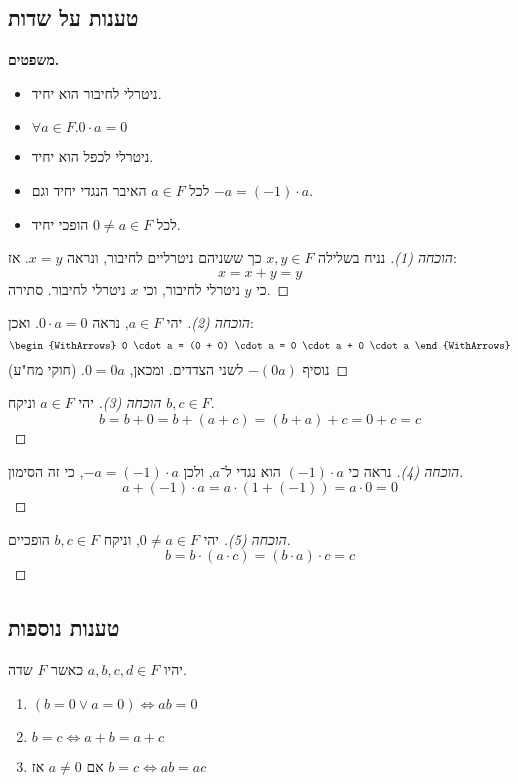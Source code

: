 \documentclass[]{article}
\begin{document}
	\subsection{טענות על שדות}
	\textbf{משפטים. }
	\begin{itemize}
		\item ניטרלי לחיבור הוא יחיד. 
		\item $\forall a \in F. 0 \cdot a = 0$ 
		\item ניטרלי לכפל הוא יחיד. 
		\item לכל $a \in F$ האיבר הנגדי יחיד וגם $-a = (-1) \cdot a$. 
		\item לכל $0 \neq a \in F$ הופכי יחיד. 
	\end{itemize}
	\begin{proof}[הוכחה (1)]נניח בשלילה $x, y \in F$ כך ששניהם ניטרליים לחיבור, ונראה $x = y$. אז: 
		\[ x = x + y = y \]
		כי $y$ ניטרלי לחיבור, וכי $x$ ניטרלי לחיבור. סתירה. 
	\end{proof}
	
	\begin{proof}[הוכחה (2)]
		יהי $a \in F$, נראה $0 \cdot a = 0$. ואכן: 
		\[ \begin{WithArrows}
			0 \cdot a = (0 + 0) \cdot a = 0 \cdot a + 0 \cdot a
		\end{WithArrows} \]
		נוסיף $-(0a)$ לשני הצדדים. ומכאן, $0 = 0a$. (חוקי מח"ע)
	\end{proof}
	
	\begin{proof}[הוכחה (3)]
		יהי $a \in F$ וניקח $b, c \in F$. 
		\[ b = b + 0 = b + (a + c) = (b + a) + c = 0 + c = c \]
	\end{proof}
	
	\begin{proof}[הוכחה (4)]
		נראה כי $(-1) \cdot a$ הוא נגדי ל־$a$, ולכן $-a = (-1) \cdot a$, כי זה הסימון. 
		\[ a + (-1) \cdot a = a \cdot (1 + (-1)) = a \cdot 0 = 0 \]
	\end{proof}
	
	\begin{proof}[הוכחה (5)]
		יהי $0 \neq a \in F$, וניקח $b, c \in F$ הופכיים. 
		\[ b = b \cdot (a \cdot c) = (b \cdot a) \cdot c = c \]
	\end{proof}
	
	\subsection{טענות נוספות}
	יהיו $a, b, c, d \in F$ כאשר $F$ שדה. 
	\begin{enumerate}
		\item \hfil $(b = 0 \lor a = 0) \iff ab = 0$ \hfil 
		\item \hfil $b = c \iff a + b = a + c$ \hfil 
		\item אם $a \neq 0 $ אז $b = c \iff ab = ac$
	\end{enumerate}
	
\end{document}
